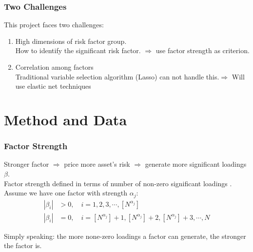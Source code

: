 \documentclass[12pt]{beamer}
\begin{document}
\begin{frame}
	\frametitle{Two Challenges}
	This project faces two challenges:
	\begin{enumerate}
		\item	 High dimensions of risk factor group.\\
		How to identify the significant risk factor. $\Rightarrow$ \alert{use factor strength as criterion.}
		\item 	Correlation among factors \\
		Traditional variable selection algorithm (Lasso) can not handle this.$\Rightarrow$ Will use \alert{elastic net} techniques
	\end{enumerate}
\end{frame}





	\section{Method and Data}
	

	
	\begin{frame}
		\frametitle{Factor Strength}
		Stronger factor $\Rightarrow$ price more asset's risk $\Rightarrow$ generate more significant loadings $\beta$.\\
		Factor strength defined in terms of number of non-zero significant loadings \cite{Bailey2020}.\\
		
		 Assume we have one factor with strength $\alpha_j$:
		\begin{align*}
		|\beta_{i}| &> 0,\quad i = 1, 2, 3, \cdots, [N^{\alpha_j}]\\
		|\beta_{i}|&= 0, \quad i = [N^{\alpha_j} ]+1 ,[N^{\alpha_j}]  +2, [N^{\alpha_j}] +3, \cdots, N
		\end{align*}
	
Simply speaking: the more none-zero loadings a factor can generate, the stronger the factor is.
	\end{frame}
\end{document}
